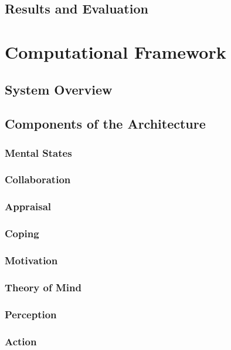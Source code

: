 \documentclass[12pt]{report}
\begin{document}
\section{Results and Evaluation}

\chapter{Computational Framework}
\label{ch:framework}

\section{System Overview}

\section{Components of the Architecture}

\subsection{Mental States}

\subsection{Collaboration}

\subsection{Appraisal}

\subsection{Coping}

\subsection{Motivation}

\subsection{Theory of Mind}

\subsection{Perception}

\subsection{Action}
\end{document}
